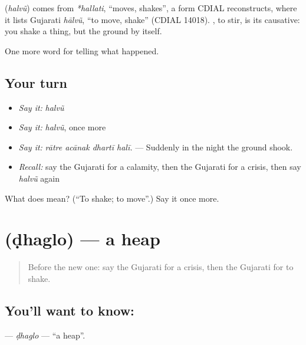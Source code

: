 \begin{cousinweb}
\textbf{} (\emph{halvũ}) comes from \emph{*hallati}, \textquotedblleft{}moves, shakes\textquotedblright{}, a form CDIAL reconstructs, where it lists Gujarati \emph{hālvũ}, \textquotedblleft{}to move, shake\textquotedblright{} (CDIAL 14018). \textbf{}, to stir, is its causative: you shake a thing, but the ground \textbf{ } by itself.
\end{cousinweb}

\begin{grammarlens}[title={What you've built}]
One more word for telling what happened.
\end{grammarlens}

\subsection*{Your turn}
\begin{itemize}
\raggedright
  \item \emph{Say it:} \emph{halvũ}
  \item \emph{Say it:} \emph{halvũ}, once more
  \item \emph{Say it:} \emph{rātre acānak dhartī halī.} — Suddenly in the night the ground shook.
  \item \emph{Recall:} say the Gujarati for a calamity, then the Gujarati for a crisis, then say \emph{halvũ} again
\end{itemize}

\begin{tcolorbox}[breakable,colback=teal!4,colframe=teal!35!black,title={Before you move on}]
What does  mean? (\textquotedblleft{}To shake; to move\textquotedblright{}.) Say it once more.
\end{tcolorbox}
\section[\texorpdfstring{\gu{ઢગલો} (ḍhaglo)}{ઢગલો (ḍhaglo)}]{ (ḍhaglo) — a heap}

\label{lesson:GU-C305-dhaglo}



\begin{quote}
Before the new one: say the Gujarati for a crisis, then the Gujarati for to shake.
\end{quote}

\subsection*{You'll want to know: }
\textbf{} — \emph{ḍhaglo} — \textquotedblleft{}a heap\textquotedblright{}.

